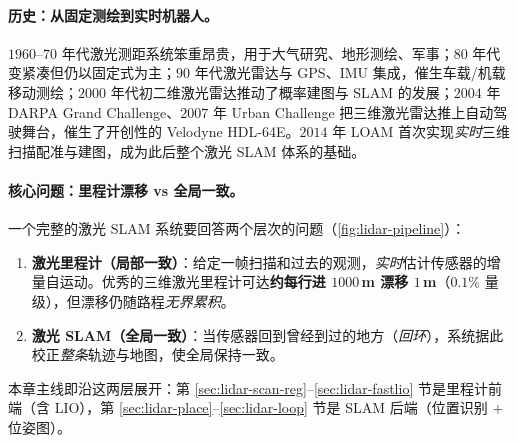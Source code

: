 \paragraph{历史：从固定测绘到实时机器人。}
$1960$–$70$ 年代激光测距系统笨重昂贵，用于大气研究、地形测绘、军事\cite{carlone2026handbook}；$80$ 年代变紧凑但仍以固定式为主；$90$ 年代激光雷达与 GPS、IMU 集成，催生车载/机载移动测绘；$2000$ 年代初二维激光雷达推动了概率建图与 SLAM 的发展；$2004$ 年 DARPA Grand Challenge、$2007$ 年 Urban Challenge 把三维激光雷达推上自动驾驶舞台，催生了开创性的 Velodyne HDL-64E。$2014$ 年 LOAM\cite{zhang2014loam} 首次实现\emph{实时}三维扫描配准与建图，成为此后整个激光 SLAM 体系的基础。

\paragraph{核心问题：里程计漂移 vs 全局一致。}
一个完整的激光 SLAM 系统要回答两个层次的问题（\cref{fig:lidar-pipeline}）：
\begin{enumerate}
  \item \textbf{激光里程计（局部一致）}：给定一帧扫描和过去的观测，\emph{实时}估计传感器的增量自运动。优秀的三维激光里程计可达\textbf{约每行进 $1000$\,m 漂移 $1$\,m}（$0.1\%$ 量级）\cite{carlone2026handbook}，但漂移仍随路程\emph{无界累积}。
  \item \textbf{激光 SLAM（全局一致）}：当传感器回到曾经到过的地方（\emph{回环}），系统据此校正\emph{整条}轨迹与地图，使全局保持一致。
\end{enumerate}
本章主线即沿这两层展开：第 \ref{sec:lidar-scan-reg}–\ref{sec:lidar-fastlio} 节是里程计前端（含 LIO），第 \ref{sec:lidar-place}–\ref{sec:lidar-loop} 节是 SLAM 后端（位置识别 + 位姿图）。

